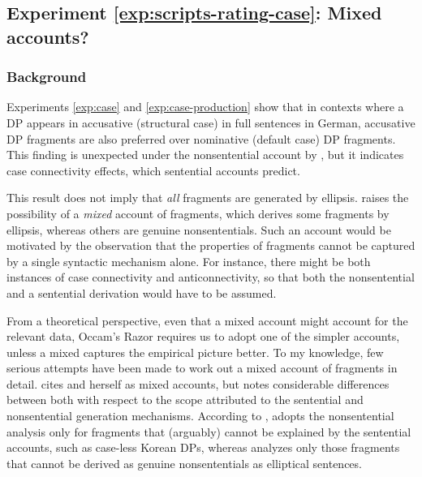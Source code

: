 \label{exp:scripts-rating-case}
\subsection{Experiment \ref{exp:scripts-rating-case}: Mixed accounts?}  \label{sec:scripts-rating-case}
\subsubsection{Background}

Experiments \ref{exp:case} and \ref{exp:case-production} show that in contexts where a DP appears in accusative (structural case) in full sentences in German, accusative DP fragments are also preferred over nominative (default case) DP fragments. This finding is unexpected under the nonsentential account by \citet{barton.progovac2005}, but it indicates case connectivity effects, which sentential accounts predict.

This result does not imply that \textit{all} fragments are generated by ellipsis. \citet{barton2006} raises the possibility of a \textit{mixed} account of fragments, which derives some fragments  by ellipsis, whereas others are genuine nonsententials. Such an account would be motivated by the observation that the properties of fragments cannot be captured by a single syntactic mechanism alone. For instance, there might be both instances of case connectivity and anticonnectivity, so that both the nonsentential and a sentential derivation would have to be assumed.

From a theoretical perspective, even that a mixed account might account for the relevant data, Occam's Razor requires us to adopt one of the simpler accounts, unless a mixed captures the empirical picture better. To my knowledge, few serious attempts have been made to work out a mixed account of fragments in detail. \citet{barton2006} cites \citet{morgan1989} and herself \citep{barton1998} as mixed accounts, but notes considerable differences between both with respect to the scope attributed to the sentential and nonsentential generation mechanisms. According to \citet{barton2006}, \citeauthor{morgan1989} adopts the nonsentential analysis only for fragments that (arguably) cannot be explained by the sentential accounts, such as case-less Korean  DPs, whereas \citet{barton1998} analyzes only those fragments that cannot be derived as genuine nonsententials as elliptical sentences. 

